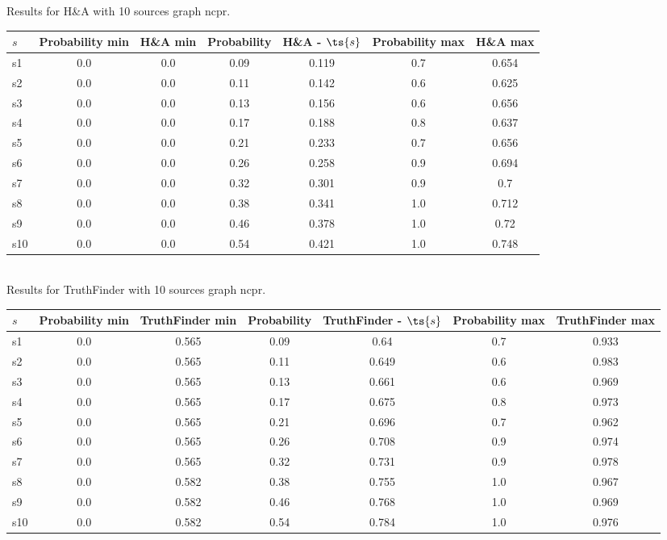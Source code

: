 \documentclass{article}
\begin{document}
\noindent Results for H\&A with 10 sources graph ncpr.

\noindent\begin{tabular}{|l|c|c|c|c|c|c|}
\hline
$s$& Probability min & H\&A min & Probability & H\&A - $\ts{s}$ & Probability max & H\&A max\\
\hline
s1 &0.0 & 0.0 & 0.09 & 0.119 & 0.7 & 0.654\\
\hline
s2 &0.0 & 0.0 & 0.11 & 0.142 & 0.6 & 0.625\\
\hline
s3 &0.0 & 0.0 & 0.13 & 0.156 & 0.6 & 0.656\\
\hline
s4 &0.0 & 0.0 & 0.17 & 0.188 & 0.8 & 0.637\\
\hline
s5 &0.0 & 0.0 & 0.21 & 0.233 & 0.7 & 0.656\\
\hline
s6 &0.0 & 0.0 & 0.26 & 0.258 & 0.9 & 0.694\\
\hline
s7 &0.0 & 0.0 & 0.32 & 0.301 & 0.9 & 0.7\\
\hline
s8 &0.0 & 0.0 & 0.38 & 0.341 & 1.0 & 0.712\\
\hline
s9 &0.0 & 0.0 & 0.46 & 0.378 & 1.0 & 0.72\\
\hline
s10 &0.0 & 0.0 & 0.54 & 0.421 & 1.0 & 0.748\\
\hline
\end{tabular}\\

\noindent Results for TruthFinder with 10 sources graph ncpr.

\noindent\begin{tabular}{|l|c|c|c|c|c|c|}
\hline
$s$& Probability min & TruthFinder min & Probability & TruthFinder - $\ts{s}$ & Probability max & TruthFinder max\\
\hline
s1 &0.0 & 0.565 & 0.09 & 0.64 & 0.7 & 0.933\\
\hline
s2 &0.0 & 0.565 & 0.11 & 0.649 & 0.6 & 0.983\\
\hline
s3 &0.0 & 0.565 & 0.13 & 0.661 & 0.6 & 0.969\\
\hline
s4 &0.0 & 0.565 & 0.17 & 0.675 & 0.8 & 0.973\\
\hline
s5 &0.0 & 0.565 & 0.21 & 0.696 & 0.7 & 0.962\\
\hline
s6 &0.0 & 0.565 & 0.26 & 0.708 & 0.9 & 0.974\\
\hline
s7 &0.0 & 0.565 & 0.32 & 0.731 & 0.9 & 0.978\\
\hline
s8 &0.0 & 0.582 & 0.38 & 0.755 & 1.0 & 0.967\\
\hline
s9 &0.0 & 0.582 & 0.46 & 0.768 & 1.0 & 0.969\\
\hline
s10 &0.0 & 0.582 & 0.54 & 0.784 & 1.0 & 0.976\\
\hline
\end{tabular}\\
\end{document}
